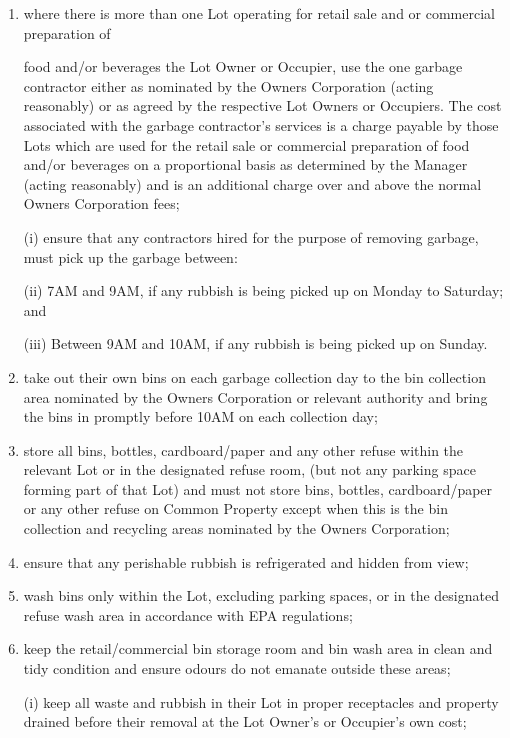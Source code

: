 \documentclass{article}
\begin{document}
\begin{enumerate}[label=\arabic*.]
\begin{enumerate}[label=\arabic{enumi}.\arabic*.]
\begin{enumerate}[label=(\arabic*)]
\begin{enumerate}[label=(\alph*)]
\item  where there is more than one Lot operating for retail sale and or commercial preparation of
\newpage

food and/or beverages the Lot Owner or Occupier, use the one garbage contractor either as nominated by the Owners Corporation (acting reasonably) or as agreed by the respective Lot Owners or Occupiers. The cost associated with the garbage contractor’s services is a charge payable by those Lots which are used for the retail sale or commercial preparation of food and/or beverages on a proportional basis as determined by the Manager (acting reasonably) and is an additional charge over and above the normal Owners Corporation fees;

(i) ensure that any contractors hired for the purpose of removing garbage, must pick up the garbage between:

(ii) 7AM and 9AM, if any rubbish is being picked up on Monday to Saturday; and

(iii) Between 9AM and 10AM, if any rubbish is being picked up on Sunday.

\item  take out their own bins on each garbage collection day to the bin collection area nominated by the Owners Corporation or relevant authority and bring the bins in promptly before 10AM on each collection day;

\item  store all bins, bottles, cardboard/paper and any other refuse within the relevant Lot or in the designated refuse room, (but not any parking space forming part of that Lot) and must not store bins, bottles, cardboard/paper or any other refuse on Common Property except when this is the bin collection and recycling areas nominated by the Owners Corporation;

\item  ensure that any perishable rubbish is refrigerated and hidden from view;

\item  wash bins only within the Lot, excluding parking spaces, or in the designated refuse wash area in accordance with EPA regulations;

\item  keep the retail/commercial bin storage room and bin wash area in clean and tidy condition and ensure odours do not emanate outside these areas;

(i) keep all waste and rubbish in their Lot in proper receptacles and property drained before their removal at the Lot Owner’s or Occupier’s own cost;


\end{enumerate}
\end{enumerate}
\end{enumerate}
\end{enumerate}
\end{document}
